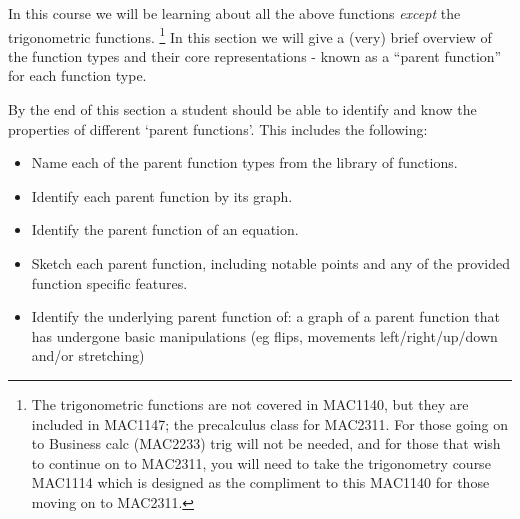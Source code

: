\documentclass{ximeraXloud}
\begin{document}
    In this course we will be learning about all the above functions \textit{except} the trigonometric functions.%
    \footnote{
        The trigonometric functions are not covered in MAC1140, but they are included in MAC1147; the precalculus class for MAC2311. For those going on to Business calc (MAC2233) trig will not be needed, and for those that wish to continue on to MAC2311, you will need to take the trigonometry course MAC1114 which is designed as the compliment to this MAC1140 for those moving on to MAC2311.
        }
    In this section we will give a (very) brief overview of the function types and their core representations - known as a ``parent function'' for each function type.
    
    By the end of this section a student should be able to identify and know the properties of different `parent functions'. This includes the following:
    \begin{itemize}
        \item Name each of the parent function types from the library of functions.
        \item Identify each parent function by its graph.
        \item Identify the parent function of an equation.
        \item Sketch each parent function, including notable points and any of the provided function specific features.
        \item Identify the underlying parent function of: a graph of a parent function that has undergone basic manipulations (eg flips, movements left/right/up/down and/or stretching) 
    \end{itemize}
\end{document}
